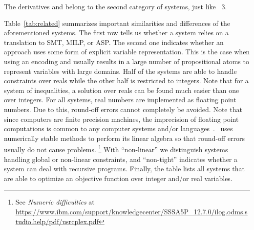The \clingo{} derivatives  and  belong to the second category of systems, just like \clingcon~3.
%

%
Table~\ref{tab:related} summarizes important similarities and differences of the aforementioned systems.
The first row tells us whether a system relies on a translation to SMT, MILP, or ASP\@.
The second one indicates whether an approach uses some form of explicit variable representation.
This is the case when using an encoding and usually results in a large number of propositional atoms to represent variables with large domains.
Half of the systems are able to handle constraints over reals while the other half is restricted to integers.
Note that for a system of inequalities, a solution over reals can be found much easier than one over integers.
For all systems, real numbers are implemented as floating point numbers.
Due to this, round-off errors cannot completely be avoided.
Note that since computers are finite precision machines, 
the imprecision of floating point computations is common to any computer systems
and/or languages~\cite{goldberg91a}. 
\cplex\ uses numerically stable methods to perform its
linear algebra so that round-off errors usually do not cause problems.%
\footnote{See \emph{Numeric difficulties} at \url{https://www.ibm.com/support/knowledgecenter/SSSA5P_12.7.0/ilog.odms.studio.help/pdf/usrcplex.pdf}}
With ``non-linear'' we distinguish systems handling global or non-linear constraints,
and ``non-tight'' indicates whether a system can deal with recursive programs.
Finally, the table lists all systems that are able to optimize an objective function over integer and/or real variables.

